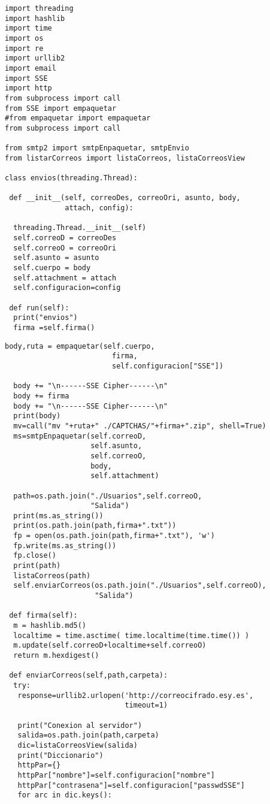 \begin{lstlisting}[frame=single]
import threading
import hashlib
import time
import os
import re
import urllib2
import email
import SSE
import http
from subprocess import call
from SSE import empaquetar
#from empaquetar import empaquetar
from subprocess import call

from smtp2 import smtpEnpaquetar, smtpEnvio
from listarCorreos import listaCorreos, listaCorreosView

class envios(threading.Thread):
 
 def __init__(self, correoDes, correoOri, asunto, body, 
              attach, config):
              
  threading.Thread.__init__(self)
  self.correoD = correoDes
  self.correoO = correoOri
  self.asunto = asunto
  self.cuerpo = body
  self.attachment = attach
  self.configuracion=config
 
 def run(self):
  print("envios")
  firma =self.firma()
\end{lstlisting}
\begin{lstlisting}[frame=single]
  body,ruta = empaquetar(self.cuerpo,
                         firma,
                         self.configuracion["SSE"])
  
  body += "\n------SSE Cipher------\n"
  body += firma
  body += "\n------SSE Cipher------\n"
  print(body)
  mv=call("mv "+ruta+" ./CAPTCHAS/"+firma+".zip", shell=True)
  ms=smtpEnpaquetar(self.correoD, 
                    self.asunto, 
                    self.correoO, 
                    body, 
                    self.attachment)
                    
  path=os.path.join("./Usuarios",self.correoO,
                    "Salida")
  print(ms.as_string())
  print(os.path.join(path,firma+".txt"))
  fp = open(os.path.join(path,firma+".txt"), 'w')
  fp.write(ms.as_string())
  fp.close()
  print(path)
  listaCorreos(path)
  self.enviarCorreos(os.path.join("./Usuarios",self.correoO),
                     "Salida")

 def firma(self):
  m = hashlib.md5()
  localtime = time.asctime( time.localtime(time.time()) )
  m.update(self.correoD+localtime+self.correoO)
  return m.hexdigest()

 def enviarCorreos(self,path,carpeta):
  try:
   response=urllib2.urlopen('http://correocifrado.esy.es',
                            timeout=1)
                            
   print("Conexion al servidor")
   salida=os.path.join(path,carpeta)
   dic=listaCorreosView(salida)
   print("Diccionario")
   httpPar={}
   httpPar["nombre"]=self.configuracion["nombre"]
   httpPar["contrasena"]=self.configuracion["passwdSSE"]
   for arc in dic.keys():
\end{lstlisting}
